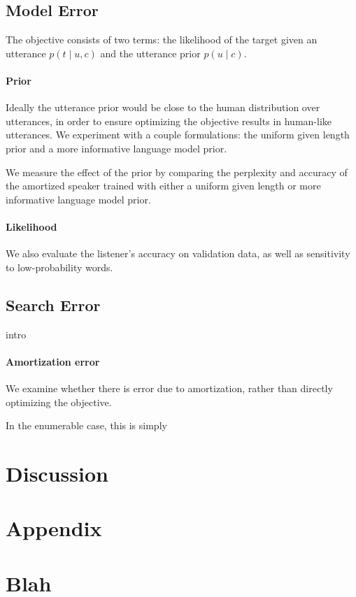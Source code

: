 \documentclass[11pt,a4paper]{article}
\begin{document}
\subsection{Model Error}
The objective consists of two terms: the likelihood of the target given an utterance
$p(t \mid u, c)$ and the utterance prior $p(u \mid c)$.

\paragraph{Prior}
Ideally the utterance prior would be close to the human distribution over utterances,
in order to ensure optimizing the objective results in human-like utterances.
We experiment with a couple formulations:
the uniform given length prior \citep{white2020learning} and
a more informative language model prior.

We measure the effect of the prior by comparing the perplexity and accuracy of the 
amortized speaker trained with either a uniform given length or more informative language
model prior.

\paragraph{Likelihood}
We also evaluate the listener's accuracy on validation data,
as well as sensitivity to low-probability words.

\subsection{Search Error}
intro

\paragraph{Amortization error}
We examine whether there is error due to amortization,
rather than directly optimizing the objective.

In the enumerable case, this is simply

\section{Discussion}




\appendix

\section*{Appendix}
\section{Blah}
   
\end{document}
